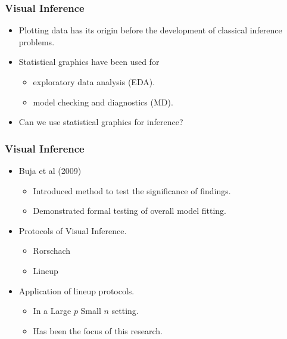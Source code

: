 \documentclass{beamer}
\begin{document}
%  



\begin{frame}
  \frametitle{Visual Inference}
		  \begin{itemize}
		  	\item Plotting data has its origin before the development of classical inference problems.
			  \item Statistical graphics have been used for
			     \begin{itemize}
			        \item exploratory data analysis (EDA).
			        \item model checking and diagnostics (MD).
           \end{itemize}				  
			  \item Can we use statistical graphics for inference?
		  \end{itemize}			
\end{frame}


\begin{frame}
\frametitle{Visual Inference}
  \begin{itemize}
    \item Buja et al (2009)
		  \begin{itemize}
			  \item Introduced method to test the significance of findings.
			  \item Demonstrated formal testing of overall model fitting.
		  \end{itemize}
		\item Protocols of Visual Inference.
		  \begin{itemize}
			  \item Rorschach
			  \item Lineup
		  \end{itemize}		
		\item Application of lineup protocols. 
		  \begin{itemize}
			  \item In a Large $p$ Small $n$ setting.
			  \item Has been the focus of this research.
		  \end{itemize}			
  \end{itemize}		  
\end{frame}
\end{document}
